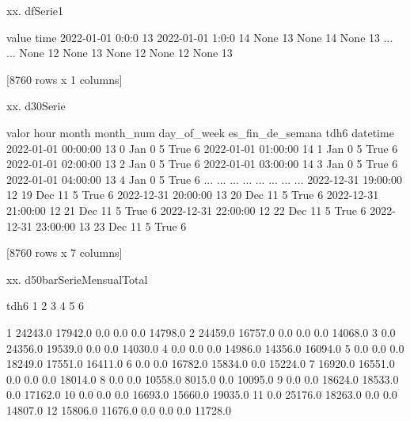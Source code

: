 \documentclass[a4paper,10pt,twocolumn]{article}
\begin{document}
\begin{Form}
xx. dfSerie1

                  value
time                   
2022-01-01 0:0:0     13
2022-01-01 1:0:0     14
None                 13
None                 14
None                 13
...                 ...
None                 12
None                 13
None                 12
None                 12
None                 13

[8760 rows x 1 columns]

xx. d30Serie

                     valor  hour month  month_num  day_of_week  es_fin_de_semana  tdh6
datetime                                                                              
2022-01-01 00:00:00     13     0   Jan          0            5              True     6
2022-01-01 01:00:00     14     1   Jan          0            5              True     6
2022-01-01 02:00:00     13     2   Jan          0            5              True     6
2022-01-01 03:00:00     14     3   Jan          0            5              True     6
2022-01-01 04:00:00     13     4   Jan          0            5              True     6
...                    ...   ...   ...        ...          ...               ...   ...
2022-12-31 19:00:00     12    19   Dec         11            5              True     6
2022-12-31 20:00:00     13    20   Dec         11            5              True     6
2022-12-31 21:00:00     12    21   Dec         11            5              True     6
2022-12-31 22:00:00     12    22   Dec         11            5              True     6
2022-12-31 23:00:00     13    23   Dec         11            5              True     6

[8760 rows x 7 columns]

xx. d50barSerieMensualTotal

tdh6        1        2        3        4        5        6
                                                          
1     24243.0  17942.0      0.0      0.0      0.0  14798.0
2     24459.0  16757.0      0.0      0.0      0.0  14068.0
3         0.0  24356.0  19539.0      0.0      0.0  14030.0
4         0.0      0.0      0.0  14986.0  14356.0  16094.0
5         0.0      0.0      0.0  18249.0  17551.0  16411.0
6         0.0      0.0  16782.0  15834.0      0.0  15224.0
7     16920.0  16551.0      0.0      0.0      0.0  18014.0
8         0.0      0.0  10558.0   8015.0      0.0  10095.0
9         0.0      0.0  18624.0  18533.0      0.0  17162.0
10        0.0      0.0      0.0  16693.0  15660.0  19035.0
11        0.0  25176.0  18263.0      0.0      0.0  14807.0
12    15806.0  11676.0      0.0      0.0      0.0  11728.0
\fi
\end{Form}
\end{document}

